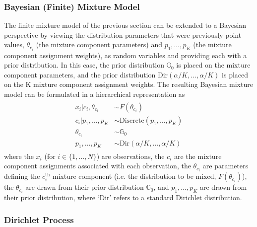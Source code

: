 \documentclass{article}
\begin{document}
\subsubsection{Bayesian (Finite) Mixture Model}


The finite mixture model of the previous section can be extended to a Bayesian perspective by viewing the distribution parameters that were previously point values, $\theta_{c_{i}}$ (the mixture component parameters) and $p_{1}, \ldots, p_{K}$ (the mixture component assignment weights), as random variables and providing each with a prior distribution. In this case, the prior distribution $\mathbb{G}_{0}$ is placed on the mixture component parameters, and the prior distribution $\text{Dir}(\alpha/K, \ldots, \alpha/K)$ is placed on the K mixture component assignment weights. The resulting Bayesian mixture model can be formulated in a hierarchical representation as
\begin{align}
\begin{split}
	\label{bayesian_mixture_model}
	x_{i}|c_{i}, \theta_{c_{i}}  &\sim  F(\theta_{c_{i}}) \\
	c_{i}|p_{1}, \ldots, p_{K}  &\sim  \text{Discrete}(p_{1}, \ldots, p_{K}) \\
	\theta_{c_{i}}  &\sim  \mathbb{G}_{0} \\
	p_{1}, \ldots, p_{K}  &\sim  \text{Dir}(\alpha/K, \ldots, \alpha/K)
\end{split}
\end{align}
where the $x_{i}$ (for $i \in \{ 1, \ldots, N \}$) are observations, the $c_{i}$ are the mixture component assignments associated with each observation, the $\theta_{c_{i}}$ are parameters defining the $c_{i}^{\text{th}}$ mixture component (i.e. the distribution to be mixed, $F(\theta_{c_{i}})$), the $\theta_{c_{i}}$ are drawn from their prior distribution $\mathbb{G}_{0}$, and $p_{1}, \ldots, p_{K}$ are drawn from their prior distribution, where `Dir' refers to a standard Dirichlet distribution.




\subsubsection{Dirichlet Process}

\end{document}
